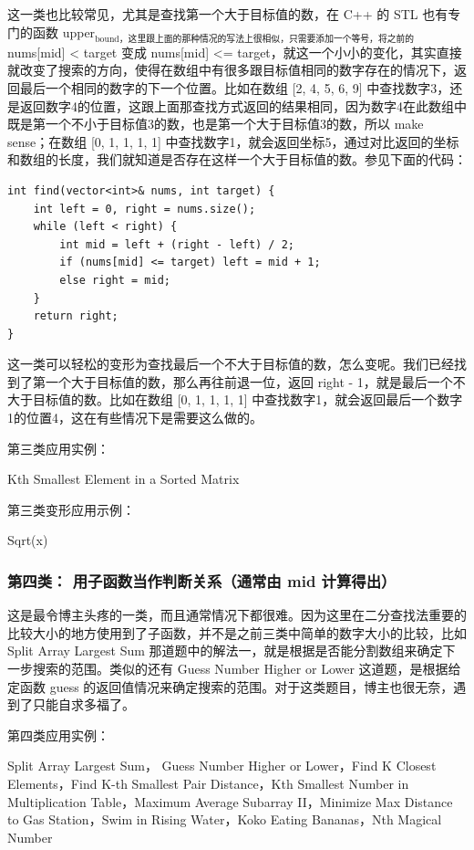 \documentclass[9pt, b5paper]{article}
\begin{document}
这一类也比较常见，尤其是查找第一个大于目标值的数，在 C++ 的 STL 也有专门的函数 upper$_{\text{bound，这里跟上面的那种情况的写法上很相似，只需要添加一个等号，将之前的}}$ nums[mid] < target 变成 nums[mid] <= target，就这一个小小的变化，其实直接就改变了搜索的方向，使得在数组中有很多跟目标值相同的数字存在的情况下，返回最后一个相同的数字的下一个位置。比如在数组 [2, 4, 5, 6, 9] 中查找数字3，还是返回数字4的位置，这跟上面那查找方式返回的结果相同，因为数字4在此数组中既是第一个不小于目标值3的数，也是第一个大于目标值3的数，所以 make sense；在数组 [0, 1, 1, 1, 1] 中查找数字1，就会返回坐标5，通过对比返回的坐标和数组的长度，我们就知道是否存在这样一个大于目标值的数。参见下面的代码：
\begin{verbatim}
int find(vector<int>& nums, int target) {
    int left = 0, right = nums.size();
    while (left < right) {
        int mid = left + (right - left) / 2;
        if (nums[mid] <= target) left = mid + 1;
        else right = mid;
    }
    return right;
}
\end{verbatim}

这一类可以轻松的变形为查找最后一个不大于目标值的数，怎么变呢。我们已经找到了第一个大于目标值的数，那么再往前退一位，返回 right - 1，就是最后一个不大于目标值的数。比如在数组 [0, 1, 1, 1, 1] 中查找数字1，就会返回最后一个数字1的位置4，这在有些情况下是需要这么做的。

第三类应用实例：

Kth Smallest Element in a Sorted Matrix

第三类变形应用示例：

Sqrt(x)

\subsubsection{第四类： 用子函数当作判断关系（通常由 mid 计算得出）}
\label{sec-14-1-4}

这是最令博主头疼的一类，而且通常情况下都很难。因为这里在二分查找法重要的比较大小的地方使用到了子函数，并不是之前三类中简单的数字大小的比较，比如 Split Array Largest Sum 那道题中的解法一，就是根据是否能分割数组来确定下一步搜索的范围。类似的还有 Guess Number Higher or Lower 这道题，是根据给定函数 guess 的返回值情况来确定搜索的范围。对于这类题目，博主也很无奈，遇到了只能自求多福了。

第四类应用实例：

Split Array Largest Sum， Guess Number Higher or Lower，Find K Closest Elements，Find K-th Smallest Pair Distance，Kth Smallest Number in Multiplication Table，Maximum Average Subarray II，Minimize Max Distance to Gas Station，Swim in Rising Water，Koko Eating Bananas，Nth Magical Number
\end{document}
